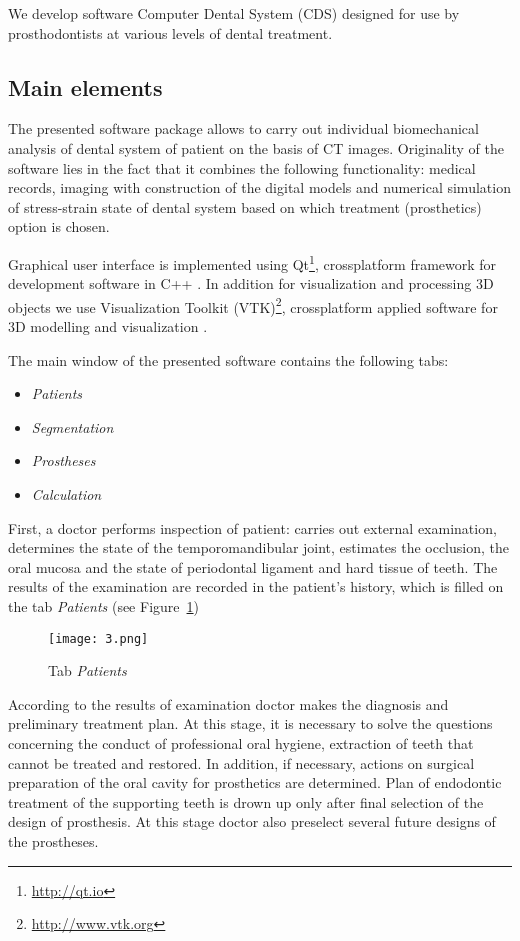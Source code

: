 \documentclass{elsarticle}
\begin{document}
We develop software \textsf{Computer Dental System} (\textsf{CDS})
designed for use by prosthodontists at various levels of dental
treatment.

\subsection{Main elements} 

The presented software package allows to carry out individual
biomechanical analysis of dental system of patient on the basis of CT
images. Originality of the software lies in the fact that it combines
the following functionality: medical records, imaging with
construction of the digital models and numerical simulation of
stress-strain state of dental system based on which treatment
(prosthetics) option is chosen.

Graphical user interface is implemented using
\textsf{Qt}\footnote{\url{http://qt.io}}, crossplatform framework for
development software in \textsf{C++}
\cite{book:246597,summerfield2011advanced}. In addition for
visualization and processing 3D objects we use \textsf{Visualization Toolkit}
\textsf{(VTK})\footnote{\url{http://www.vtk.org}}, crossplatform
applied software for 3D modelling and visualization \cite{VTKbook2006}.

The main window of the presented software contains the following tabs:
\begin{itemize}
\item \emph{Patients}
\item \emph{Segmentation}
\item \emph{Prostheses}
\item \emph{Calculation}
\end{itemize}

First, a doctor performs inspection of patient: carries out external
examination, determines the state of the temporomandibular joint,
estimates the occlusion, the oral mucosa and the state of periodontal ligament
and hard tissue of teeth. The results of the examination are recorded
in the patient's history, which is filled on the tab  \emph{Patients}
(see Figure~\ref{fig:3})
\begin{figure}[h]
  \centering
  \texttt{[image: 3.png]}
  \caption{Tab  \emph{Patients}}
  \label{fig:3}
\end{figure}

According to the results of examination doctor makes the diagnosis and
preliminary treatment plan. At this stage, it is necessary to solve
the questions concerning the conduct of professional oral hygiene,
extraction of teeth that cannot be treated and restored. In addition,
if necessary, actions on surgical preparation of the oral cavity for
prosthetics are determined. Plan of endodontic treatment of the
supporting teeth is drown up only after final selection of the design of
prosthesis. At this stage doctor also preselect several future designs
of the prostheses.
\end{document}
